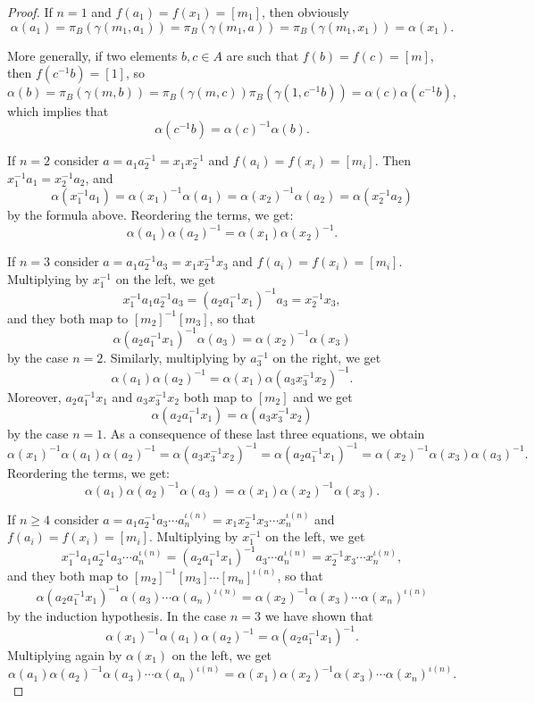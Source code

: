 \begin{lemma}
\begin{proof}
        If $n=1$ and $f(a_1)=f(x_1)=[m_1]$, then obviously
        \[ \alpha(a_1) = \pi_B(\gamma(m_1,a_1)) = \pi_B(\gamma(m_1,a)) = \pi_B(\gamma(m_1,x_1)) = \alpha(x_1). \]
        
        More generally, if two elements $b,c\in A$ are such that $f(b)=f(c)=[m]$, then $f(c^{-1}b)=[1]$, so
        \[ \alpha(b) = \pi_B(\gamma(m,b)) = \pi_B(\gamma(m,c))\pi_B(\gamma(1,c^{-1}b)) = \alpha(c)\alpha(c^{-1}b), \]
        which implies that
        \[ \alpha(c^{-1}b) = \alpha(c)^{-1}\alpha(b). \]
        
        If $n=2$ consider $a=a_1a_2^{-1}=x_1x_2^{-1}$ and $f(a_i)=f(x_i)=[m_i]$. Then $x_1^{-1}a_1 = x_2^{-1}a_2$, and
        \[ \alpha(x_1^{-1}a_1) = \alpha(x_1)^{-1}\alpha(a_1) = \alpha(x_2)^{-1}\alpha(a_2) = \alpha(x_2^{-1}a_2) \]
        by the formula above. Reordering the terms, we get:
        \[\alpha(a_1)\alpha(a_2)^{-1} = \alpha(x_1)\alpha(x_2)^{-1}. \]
        
        If $n=3$ consider $a = a_1a_2^{-1}a_3 = x_1x_2^{-1}x_3$ and $f(a_i)=f(x_i)=[m_i]$. Multiplying by $x_1^{-1}$ on the left, we get
        \[ x_1^{-1}a_1a_2^{-1}a_3 = (a_2a_1^{-1}x_1)^{-1}a_3 = x_2^{-1}x_3, \]
        and they both map to $[m_2]^{-1}[m_3]$, so that
        \[ \alpha(a_2a_1^{-1}x_1)^{-1}\alpha(a_3) = \alpha(x_2)^{-1}\alpha(x_3) \]
        by the case $n=2$. Similarly, multiplying by $a_3^{-1}$ on the right, we get
        \[ \alpha(a_1)\alpha(a_2)^{-1} = \alpha(x_1)\alpha(a_3x_3^{-1}x_2)^{-1}. \]
        Moreover, $a_2a_1^{-1}x_1$ and $a_3x_3^{-1}x_2$ both map to $[m_2]$ and we get
        \[ \alpha(a_2a_1^{-1}x_1) = \alpha(a_3x_3^{-1}x_2) \]
        by the case $n=1$. As a consequence of these last three equations, we obtain
        \[ \alpha(x_1)^{-1}\alpha(a_1)\alpha(a_2)^{-1} = \alpha(a_3x_3^{-1}x_2)^{-1} = \alpha(a_2a_1^{-1}x_1)^{-1} = \alpha(x_2)^{-1}\alpha(x_3)\alpha(a_3)^{-1}. \]
        Reordering the terms, we get:
        \[ \alpha(a_1)\alpha(a_2)^{-1}\alpha(a_3) = \alpha(x_1)\alpha(x_2)^{-1}\alpha(x_3). \]

        If $n\geq4$ consider $a = a_1a_2^{-1}a_3\cdots a_n^{\iota(n)}=x_1x_2^{-1}x_3\cdots x_n^{\iota(n)}$ and $f(a_i)=f(x_i)=[m_i]$. Multiplying by $x_1^{-1}$ on the left, we get
        \[ x_1^{-1}a_1a_2^{-1}a_3\cdots a_n^{\iota(n)}=(a_2a_1^{-1}x_1)^{-1}a_3\cdots a_n^{\iota(n)}=x_2^{-1}x_3\cdots x_n^{\iota(n)}, \]
        and they both map to $[m_2]^{-1}[m_3]\cdots[m_n]^{\iota(n)}$, so that
        \[ \alpha(a_2a_1^{-1}x_1)^{-1}\alpha(a_3)\cdots\alpha(a_n)^{\iota(n)} = \alpha(x_2)^{-1}\alpha(x_3)\cdots\alpha(x_n)^{\iota(n)} \]
        by the induction hypothesis. In the case $n=3$ we have shown that
        \[ \alpha(x_1)^{-1}\alpha(a_1)\alpha(a_2)^{-1} = \alpha(a_2a_1^{-1}x_1)^{-1}. \]
        Multiplying again by $\alpha(x_1)$ on the left, we get
        \[ \alpha(a_1)\alpha(a_2)^{-1}\alpha(a_3)\cdots\alpha(a_n)^{\iota(n)} = \alpha(x_1)\alpha(x_2)^{-1}\alpha(x_3)\cdots\alpha(x_n)^{\iota(n)}. \]
    \end{proof}
\end{lemma}
